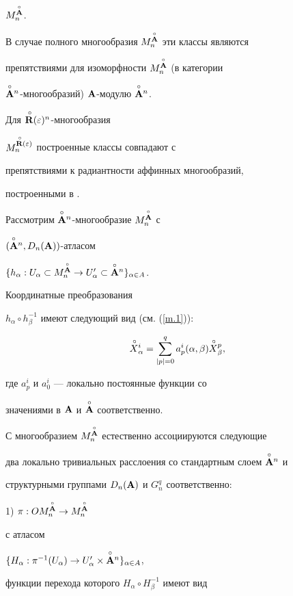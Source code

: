 ${M^{\overset{\circ}{\bold A}{}}_n}$.


В случае полного многообразия ${M^{\overset{\circ}{\bold A}{}}_n}$ эти классы являются


препятствиями для изоморфности ${M^{\overset{\circ}{\bold A}{}}_n}$ (в категории


$\overset{\circ}{\bold A}{}^n$-многообразий) ${\bold A}$-модулю $\overset{\circ}{\bold A}{}^n$.


Для ${\overset{\,\circ}{{\bold R}}{}}(\varepsilon)^n$-многообразия


$M_n^{{\overset{\,\circ}{{\bold R}}{}}(\varepsilon)}$ построенные классы совпадают с


препятствиями к радиантности аффинных многообразий,


построенными в \cite{G-H}.





Рассмотрим $\overset{\circ}{\bold A}{}^n$-многообразие ${M^{\overset{\circ}{\bold A}{}}_n}$ с


$(\overset{\circ}{\bold A}{}^n, D_n({\bold A}))$-атласом


$\{h_\alpha : U_\alpha \subset {M^{\Ao}_n} \to U_\alpha' \subset


\Aon\}_{\alpha\in A}$.


Координатные преобразования


$h_\alpha \circ h_\beta^{-1}$ имеют следующий вид (см. (\ref{m.1})):


\begin{equation}


\label{n.1}


{\puto X}{}_\alpha^i = \sum_{|p|=0}^q


a^i_p(\alpha, \beta){\puto X}{}_\beta^p,


\end{equation}


где $a_p^i$ и $a_0^i$ --- локально постоянные функции со


значениями в ${\bold A}$ и $\overset{\circ}{\bold A}{}$ соответственно.


С многообразием ${M^{\overset{\circ}{\bold A}{}}_n}$ естественно ассоциируются следующие


два локально тривиальных расслоения со стандартным слоем $\overset{\circ}{\bold A}{}^n$ и


структурными группами $D_n({\bold A})$ и $G_n^q$ соответственно:





1) $\pi : O{M^{\overset{\circ}{\bold A}{}}_n}\to {M^{\overset{\circ}{\bold A}{}}_n}$


с атласом


$\{H_\alpha:\pi^{-1}(U_\alpha)\to U'_\alpha\times\overset{\circ}{\bold A}{}^n\}_{\alpha\in A}$,


функции перехода которого $H_\alpha\circ H_\beta^{-1}$ имеют вид


